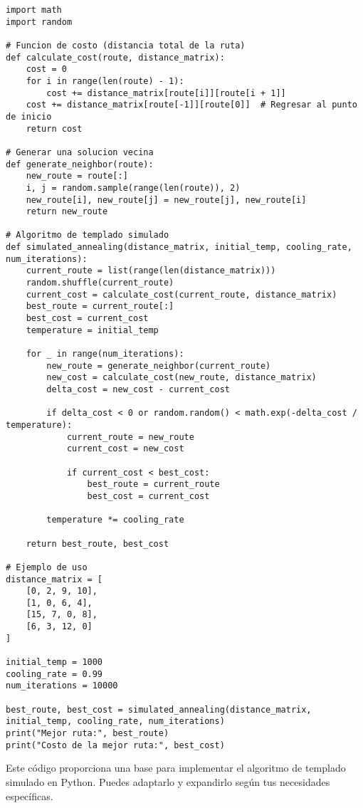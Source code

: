 \documentclass{article}
\begin{document}
\begin{lstlisting}
import math
import random

# Funcion de costo (distancia total de la ruta)
def calculate_cost(route, distance_matrix):
    cost = 0
    for i in range(len(route) - 1):
        cost += distance_matrix[route[i]][route[i + 1]]
    cost += distance_matrix[route[-1]][route[0]]  # Regresar al punto de inicio
    return cost

# Generar una solucion vecina
def generate_neighbor(route):
    new_route = route[:]
    i, j = random.sample(range(len(route)), 2)
    new_route[i], new_route[j] = new_route[j], new_route[i]
    return new_route

# Algoritmo de templado simulado
def simulated_annealing(distance_matrix, initial_temp, cooling_rate, num_iterations):
    current_route = list(range(len(distance_matrix)))
    random.shuffle(current_route)
    current_cost = calculate_cost(current_route, distance_matrix)
    best_route = current_route[:]
    best_cost = current_cost
    temperature = initial_temp

    for _ in range(num_iterations):
        new_route = generate_neighbor(current_route)
        new_cost = calculate_cost(new_route, distance_matrix)
        delta_cost = new_cost - current_cost

        if delta_cost < 0 or random.random() < math.exp(-delta_cost / temperature):
            current_route = new_route
            current_cost = new_cost

            if current_cost < best_cost:
                best_route = current_route
                best_cost = current_cost

        temperature *= cooling_rate

    return best_route, best_cost

# Ejemplo de uso
distance_matrix = [
    [0, 2, 9, 10],
    [1, 0, 6, 4],
    [15, 7, 0, 8],
    [6, 3, 12, 0]
]

initial_temp = 1000
cooling_rate = 0.99
num_iterations = 10000

best_route, best_cost = simulated_annealing(distance_matrix, initial_temp, cooling_rate, num_iterations)
print("Mejor ruta:", best_route)
print("Costo de la mejor ruta:", best_cost)
\end{lstlisting}

Este código proporciona una base para implementar el algoritmo de templado simulado en Python. Puedes adaptarlo y expandirlo según tus necesidades específicas.
\end{document}
